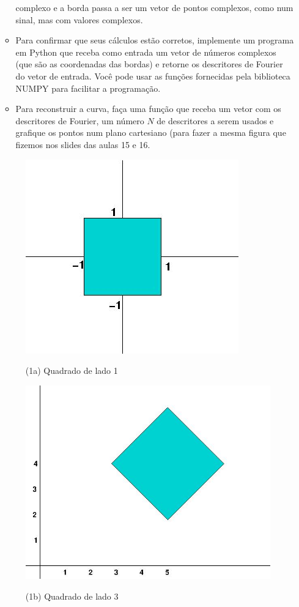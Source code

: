 \documentclass[12pt]{article}
\begin{document}
\begin{itemize}
\begin{itemize}
  complexo e a borda passa a ser um vetor de pontos complexos, como
  num sinal, mas com valores complexos.
\item Para confirmar que seus cálculos estão corretos, implemente um
  programa em Python que receba como entrada um vetor de números
  complexos (que são as coordenadas das bordas) e retorne os
  descritores de Fourier do vetor de entrada. Você pode usar as
  funções fornecidas pela biblioteca NUMPY para facilitar a
  programação. 
\item Para reconstruir a curva, faça uma função que receba um vetor
  com os descritores de Fourier, um número $N$ de descritores a serem
  usados e grafique os pontos num plano cartesiano (para fazer a mesma 
figura que fizemos nos slides das aulas 15 e 16.
\end{itemize}
\begin{figure}[htb]
\centering
\begin{minipage}[b]{0.45\textwidth}
	\centering
        \includegraphics[scale=0.2]{Q3Images/square1.jpg} 
	\centerline{\label{fig1a} \small (1a) Quadrado de lado 1}
\end{minipage}
\begin{minipage}[b]{0.45\textwidth}
	\centering
        \includegraphics[scale=0.3]{Q3Images/square3.jpg} 
	\centerline{\label{fig1b} \small (1b) Quadrado de lado 3}
\end{minipage}
\end{figure}


\end{itemize}
\end{document}
